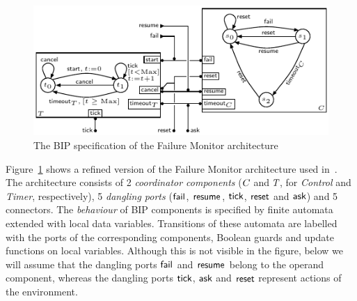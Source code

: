 \documentclass[smallcondensed]{svjour3}
\newcommand{\mdash}{---}
\newcommand{\resp}[1][\ ]{resp.#1}
\newcommand{\goesto}[2][]{\ensuremath{\xrightarrow[#1]{#2}}}
\newcommand{\true}{\ensuremath{\mathit{true}}}
\begin{document}
\begin{figure}[t]
  \centering
  \includegraphics[width=\columnwidth]{ActaXFIG/BIPspec-ArchFailureTimer-v2-2}
  \caption{The BIP specification of the Failure Monitor architecture}
  \label{schema:ArchFailure:BIP}
\end{figure}

Figure~\ref{schema:ArchFailure:BIP} shows a refined version of the
Failure Monitor architecture used in~\cite{CubETH-case-study}.
%
The architecture consists of 2 \emph{coordinator components}
($C_{}$ and $T_{}$, for \emph{Control} and \emph{Timer},
respectively), 5 \emph{dangling ports} ($\mathsf{fail}_{}$, $\mathsf{resume}_{}$,
$\mathsf{tick}$, $\mathsf{reset}$ and $\mathsf{ask}$) and 5 connectors.
%
The  \emph{behaviour} of BIP components %
is specified by finite automata extended with
local data variables.  Transitions of these automata are labelled with
the ports of the corresponding components, Boolean guards and update
functions on local variables.  %
Although this is not visible in the figure, below we will assume that
the dangling ports $\mathsf{fail}_{}$ and $\mathsf{resume}_{}$ belong to the operand
component, whereas the dangling ports $\mathsf{tick}$, $\mathsf{ask}$ and
$\mathsf{reset}$ represent actions of the environment.  
\end{document}
